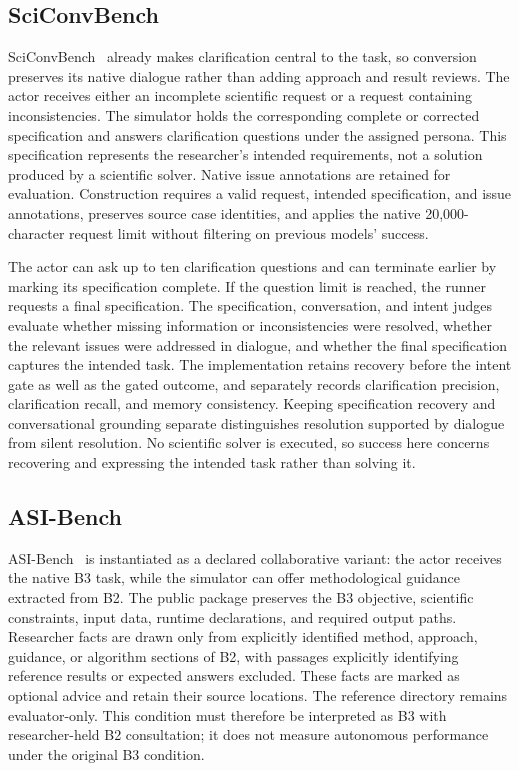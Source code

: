 \subsection{SciConvBench}
\label{app:sciconvbench}
SciConvBench~\cite{somasekharan2026sciconvbench} already makes clarification
central to the task, so conversion preserves its native dialogue rather than
adding approach and result reviews. The actor receives either an incomplete
scientific request or a request containing inconsistencies. The simulator
holds the corresponding complete or corrected specification and answers
clarification questions under the assigned persona. This specification
represents the researcher's intended requirements, not a solution produced
by a scientific solver. Native issue annotations are retained for evaluation.
Construction requires a valid request, intended specification, and issue
annotations, preserves source case identities, and applies the native
20,000-character request limit without filtering on previous models' success.

The actor can ask up to ten clarification questions and can terminate earlier
by marking its specification complete. If the question limit is reached, the
runner requests a final specification. The specification, conversation,
and intent judges evaluate whether missing information or inconsistencies
were resolved, whether the relevant issues were addressed in dialogue, and
whether the final specification captures the intended task. The implementation
retains recovery before the intent gate as well as the gated outcome, and
separately records clarification precision, clarification recall, and memory
consistency. Keeping specification recovery and conversational grounding
separate distinguishes resolution supported by dialogue from silent
resolution. No scientific solver is executed, so success here concerns
recovering and expressing the intended task rather than solving it.

\subsection{ASI-Bench}
\label{app:asibench}
ASI-Bench~\cite{zhou2026asibench} is instantiated as a declared collaborative
variant: the actor receives the native B3 task, while the simulator can offer
methodological guidance extracted from B2. The public package preserves the
B3 objective, scientific constraints, input data, runtime declarations, and
required output paths. Researcher facts are drawn only from explicitly
identified method, approach, guidance, or algorithm sections of B2, with
passages explicitly identifying reference results or expected answers
excluded. These facts are marked as optional advice and retain their source
locations. The reference directory remains evaluator-only. This condition
must therefore be interpreted as B3 with researcher-held B2 consultation;
it does not measure autonomous performance under the original B3 condition.

